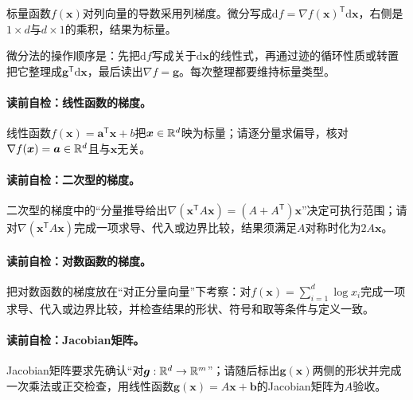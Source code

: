 标量函数$f(\boldsymbol{x})$对列向量的导数采用列梯度。微分写成$\mathrm df=\nabla f(\boldsymbol{x})^{\mathsf T}\mathrm d\boldsymbol{x}$，右侧是$1\times d$与$d\times1$的乘积，结果为标量。

微分法的操作顺序是：先把$\mathrm df$写成关于$\mathrm d\boldsymbol{x}$的线性式，再通过迹的循环性质或转置把它整理成$\boldsymbol g^{\mathsf T}\mathrm d\boldsymbol{x}$，最后读出$\nabla f=\boldsymbol g$。每次整理都要维持标量类型。


\paragraph{读前自检：线性函数的梯度。}线性函数$f(\boldsymbol x)=\boldsymbol a^{\mathsf T}\boldsymbol x+b$把$\boldsymbol x\in\mathbb{R}^d$映为标量；请逐分量求偏导，核对$\nabla f(\boldsymbol x)=\boldsymbol a\in\mathbb{R}^d$且与$\boldsymbol x$无关。\par
\paragraph{读前自检：二次型的梯度。}二次型的梯度中的“分量推导给出$\nabla(\boldsymbol{x}^{\mathsf T}A\boldsymbol{x})=(A+A^{\mathsf T})\boldsymbol{x}$”决定可执行范围；请对$\nabla(\boldsymbol{x}^{\mathsf T}A\boldsymbol{x})$完成一项求导、代入或边界比较，结果须满足$A$对称时化为$2A\boldsymbol{x}$。\par
\paragraph{读前自检：对数函数的梯度。}把对数函数的梯度放在“对正分量向量”下考察：对$f(\boldsymbol x)=\sum_{i=1}^{d}\log x_i$完成一项求导、代入或边界比较，并检查结果的形状、符号和取等条件与定义一致。\par
\paragraph{读前自检：Jacobian矩阵。}Jacobian矩阵要求先确认“对$\boldsymbol g:\mathbb{R}^d\to\mathbb{R}^m$”；请随后标出$\boldsymbol g(\boldsymbol x)$两侧的形状并完成一次乘法或正交检查，用线性函数$\boldsymbol g(\boldsymbol x)=A\boldsymbol x+\boldsymbol b$的Jacobian矩阵为$A$验收。\par

